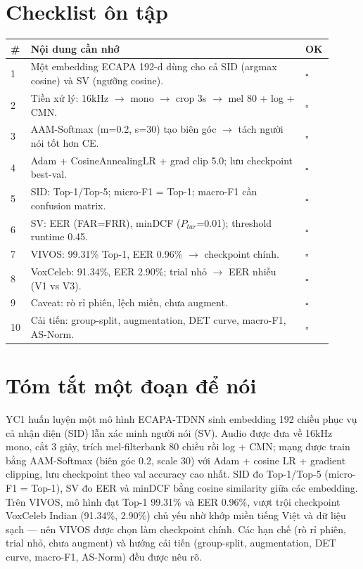\documentclass[12pt,a4paper]{article}
\begin{document}
\section{Checklist ôn tập}
\begin{table}[H]
\centering\small
\begin{tabular}{p{0.04\linewidth}p{0.82\linewidth}p{0.05\linewidth}}
\toprule
\textbf{\#} & \textbf{Nội dung cần nhớ} & \textbf{OK} \\
\midrule
1 & Một embedding ECAPA 192-d dùng cho cả SID (argmax cosine) và SV (ngưỡng cosine). & $\square$ \\
2 & Tiền xử lý: 16kHz $\to$ mono $\to$ crop 3s $\to$ mel 80 + log + CMN. & $\square$ \\
3 & AAM-Softmax (m=0.2, s=30) tạo biên góc $\to$ tách người nói tốt hơn CE. & $\square$ \\
4 & Adam + CosineAnnealingLR + grad clip 5.0; lưu checkpoint best-val. & $\square$ \\
5 & SID: Top-1/Top-5; micro-F1 = Top-1; macro-F1 cần confusion matrix. & $\square$ \\
6 & SV: EER (FAR=FRR), minDCF ($P_{tar}$=0.01); threshold runtime 0.45. & $\square$ \\
7 & VIVOS: 99.31\% Top-1, EER 0.96\% $\to$ checkpoint chính. & $\square$ \\
8 & VoxCeleb: 91.34\%, EER 2.90\%; trial nhỏ $\to$ EER nhiễu (V1 vs V3). & $\square$ \\
9 & Caveat: rò rỉ phiên, lệch miền, chưa augment. & $\square$ \\
10 & Cải tiến: group-split, augmentation, DET curve, macro-F1, AS-Norm. & $\square$ \\
\bottomrule
\end{tabular}
\end{table}

\section{Tóm tắt một đoạn để nói}
YC1 huấn luyện một mô hình ECAPA-TDNN sinh embedding 192 chiều phục vụ cả nhận diện
(SID) lẫn xác minh người nói (SV). Audio được đưa về 16kHz mono, cắt 3 giây, trích
mel-filterbank 80 chiều rồi log + CMN; mạng được train bằng AAM-Softmax (biên góc
0.2, scale 30) với Adam + cosine LR + gradient clipping, lưu checkpoint theo val
accuracy cao nhất. SID đo Top-1/Top-5 (micro-F1 = Top-1), SV đo EER và minDCF bằng
cosine similarity giữa các embedding. Trên VIVOS, mô hình đạt Top-1 99.31\% và EER
0.96\%, vượt trội checkpoint VoxCeleb Indian (91.34\%, 2.90\%) chủ yếu nhờ khớp miền
tiếng Việt và dữ liệu sạch --- nên VIVOS được chọn làm checkpoint chính. Các hạn chế
(rò rỉ phiên, trial nhỏ, chưa augment) và hướng cải tiến (group-split, augmentation,
DET curve, macro-F1, AS-Norm) đều được nêu rõ.
\end{document}
